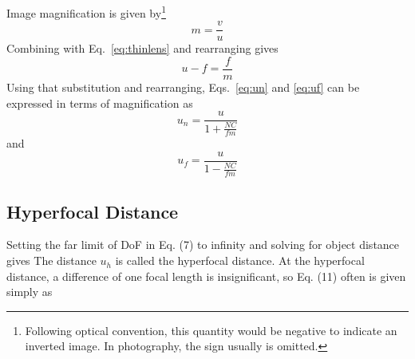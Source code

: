 \documentclass[11pt, oneside]{scrartcl}   	%
\begin{document}
Image magnification is given by\footnote{Following optical convention, this quantity would be negative to indicate an inverted image. In photography, the sign usually is omitted.}
\begin{equation}
      m=\frac v u
   \label{eq:mvu}
\end{equation}
Combining with Eq.~\ref{eq:thinlens} and rearranging gives
\begin{equation}
   u-f = \frac f m
\end{equation}
 Using that substitution and rearranging, Eqs.~\ref{eq:un} and \ref{eq:uf} can be expressed in terms of magnification as
\begin{equation}
      u_n=\frac u{1+\frac{NC}{fm}}
   \label{eq:un2}
\end{equation}
and
\begin{equation}
      u_f=\frac u{1-\frac{NC}{fm}}
   \label{eq:uf2}
\end{equation}

\subsection{Hyperfocal Distance}


Setting the far limit of DoF in Eq. (7) to infinity and solving for object distance gives
The distance $u_h$ is called the hyperfocal distance. At the hyperfocal distance, a difference of
one focal length is insignificant, so Eq. (11) often is given simply as

\end{document}

